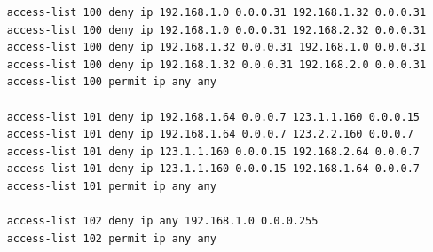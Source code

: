 \documentclass[12pt,a4paper, oneside]{memoir}
\begin{document}
\begin{verbatim}
	access-list 100 deny ip 192.168.1.0 0.0.0.31 192.168.1.32 0.0.0.31
	access-list 100 deny ip 192.168.1.0 0.0.0.31 192.168.2.32 0.0.0.31
	access-list 100 deny ip 192.168.1.32 0.0.0.31 192.168.1.0 0.0.0.31
	access-list 100 deny ip 192.168.1.32 0.0.0.31 192.168.2.0 0.0.0.31
	access-list 100 permit ip any any
	
	access-list 101 deny ip 192.168.1.64 0.0.0.7 123.1.1.160 0.0.0.15
	access-list 101 deny ip 192.168.1.64 0.0.0.7 123.2.2.160 0.0.0.7
	access-list 101 deny ip 123.1.1.160 0.0.0.15 192.168.2.64 0.0.0.7
	access-list 101 deny ip 123.1.1.160 0.0.0.15 192.168.1.64 0.0.0.7
	access-list 101 permit ip any any
	
	access-list 102 deny ip any 192.168.1.0 0.0.0.255
	access-list 102 permit ip any any	
	
\end{verbatim}
\end{document}
